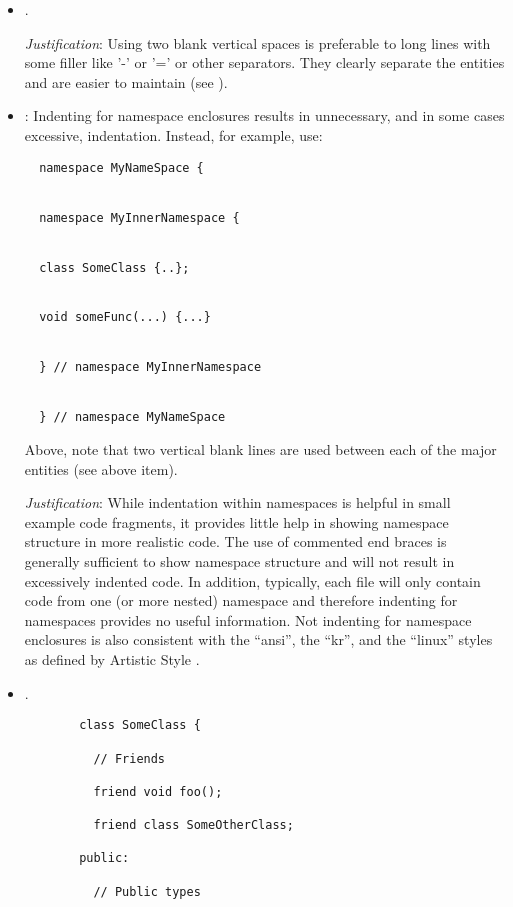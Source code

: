 \begin{itemize}
\item\FSCTwoVertialSpaces.

  \textit{Justification}: Using two blank vertical spaces is
  preferable to long lines with some filler like '-' or '=' or other
  separators.  They clearly separate the entities and are easier to
  maintain (see \cite[Section 31.8]{CodeComplete2nd04}).


{}\item\FSCNoNamespaceIndent: Indenting for namespace enclosures results in
unnecessary, and in some cases excessive, indentation.  Instead, for example,
use:

{\small\begin{verbatim}
  namespace MyNameSpace {


  namespace MyInnerNamespace {


  class SomeClass {..};


  void someFunc(...) {...}


  } // namespace MyInnerNamespace


  } // namespace MyNameSpace
\end{verbatim}}

Above, note that two vertical blank lines are used between each of the
major entities (see above item).

\textit{Justification}: While indentation within namespaces is helpful
in small example code fragments, it provides little help in showing
namespace structure in more realistic code.  The use of commented end
braces is generally sufficient to show namespace structure and will
not result in excessively indented code.  In addition, typically, each
file will only contain code from one (or more nested) namespace and
therefore indenting for namespaces provides no useful information.
Not indenting for namespace enclosures is also consistent with the
``ansi'', the ``kr'', and the ``linux'' styles as defined by Artistic
Style \cite{ArtisticStyle}.


\item\FSCClassDeclarationLayout.

\begin{figure}
%
{\small\begin{verbatim}
  class SomeClass {

    // Friends

    friend void foo();

    friend class SomeOtherClass;

  public:

    // Public types


\end{verbatim}}
\end{figure}
\end{itemize}
